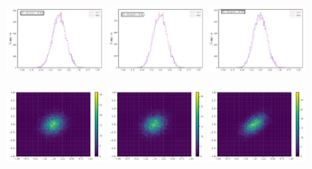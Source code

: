 \documentclass[twocolumn,preprintnumbers,superscriptaddress]{revtex4-2}
\begin{document}
\begin{figure}
  \includegraphics[width=0.25\textwidth]{plots/3Dgaussian_posdef/1-distribution_10000_100_3_5_2_10000_128_0.5.pdf}%
  \includegraphics[width=0.25\textwidth]{plots/3Dgaussian_posdef/2-distribution_10000_100_3_5_2_10000_128_0.5.pdf}%
  \includegraphics[width=0.25\textwidth]{plots/3Dgaussian_posdef/3-distribution_10000_100_3_5_2_10000_128_0.5.pdf}

  \includegraphics[width=0.25\textwidth]{plots/3Dgaussian_posdef/1-2_REAL_10000_100.pdf}%
  \includegraphics[width=0.25\textwidth]{plots/3Dgaussian_posdef/2-3_REAL_10000_100.pdf}%
  \includegraphics[width=0.25\textwidth]{plots/3Dgaussian_posdef/3-1_REAL_10000_100.pdf}


\end{figure}
\end{document}

